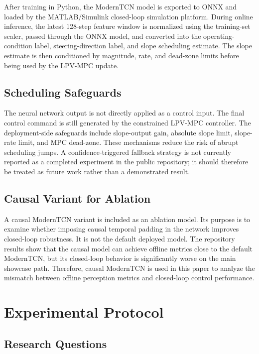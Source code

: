 \documentclass[twocolumn]{article}
\begin{document}
After training in Python, the ModernTCN model is exported to ONNX and loaded by the MATLAB/Simulink closed-loop simulation platform. During online inference, the latest 128-step feature window is normalized using the training-set scaler, passed through the ONNX model, and converted into the operating-condition label, steering-direction label, and slope scheduling estimate. The slope estimate is then conditioned by magnitude, rate, and dead-zone limits before being used by the LPV-MPC update.

\subsection{Scheduling Safeguards}

The neural network output is not directly applied as a control input. The final control command is still generated by the constrained LPV-MPC controller. The deployment-side safeguards include slope-output gain, absolute slope limit, slope-rate limit, and MPC dead-zone. These mechanisms reduce the risk of abrupt scheduling jumps. A confidence-triggered fallback strategy is not currently reported as a completed experiment in the public repository; it should therefore be treated as future work rather than a demonstrated result.

\subsection{Causal Variant for Ablation}

A causal ModernTCN variant is included as an ablation model. Its purpose is to examine whether imposing causal temporal padding in the network improves closed-loop robustness. It is not the default deployed model. The repository results show that the causal model can achieve offline metrics close to the default ModernTCN, but its closed-loop behavior is significantly worse on the main showcase path. Therefore, causal ModernTCN is used in this paper to analyze the mismatch between offline perception metrics and closed-loop control performance.

\section{Experimental Protocol}

\label{sec:experiments}

\subsection{Research Questions}
\end{document}
